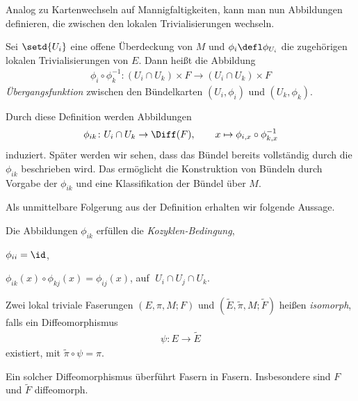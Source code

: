 \documentclass[%
	paper=a5,%
	fleqn,%
	DIV=18,%
	BCOR=0mm,
	fontsize=11pt,
	titlepage=false,%
	bibliography=totoc,
	DIV=18,%
	twoside=true,
	pdftitle=Riemannsche Geometrie,
	pdfauthor=Uwe Semmelmann,
	numbers=noendperiod]%
	{scrbook}
\begin{document}
Analog zu Kartenwechseln auf Mannigfaltigkeiten, kann man nun
Abbildungen definieren, die zwischen den lokalen Trivialisierungen wechseln.

\begin{defn}
Sei $\setd{U_i}$ eine offene Überdeckung von $M$ und $\phi_i\defl \phi_{U_i}$
die zugehörigen lokalen Trivialisierungen von $E$. Dann heißt die Abbildung
\begin{align*}
\phi_i\circ\phi_k^{-1} \colon (U_i\cap U_k)\times F\to (U_i\cap U_k)\times F
\end{align*}
\emph{Übergangsfunktion} zwischen den Bündelkarten $(U_i,\phi_i)$ und
$(U_k,\phi_k)$.\fish
\end{defn}


Durch diese Definition werden Abbildungen
\begin{align*}
\phi_{ik}\colon U_i\cap U_k\to \Diff(F),\qquad x\mapsto
\phi_{i,x}\circ\phi_{k,x}^{-1}
\end{align*}
induziert. Später werden wir sehen, dass das Bündel bereits vollständig durch
die $\phi_{ik}$ beschrieben wird. Das ermöglicht die Konstruktion von Bündeln
durch Vorgabe der $\phi_{ik}$ und eine Klassifikation der Bündel über $M$.

Als unmittelbare Folgerung aus der Definition erhalten wir folgende Aussage.

\begin{lem}
Die Abbildungen $\phi_{ik}$ erfüllen die \emph{Kozyklen-Bedingung},
\begin{propenum}
\item $\phi_{ii} = \id$,
\item $\phi_{ik}(x)\circ\phi_{kj}(x) = \phi_{ij}(x)$,\qquad
auf $ \;U_i\cap U_j\cap U_k$.\fish
\end{propenum}
\end{lem}


\begin{defn}
Zwei lokal triviale Faserungen $(E,\pi,M;F)$ und
$(\tilde{E},\tilde{\pi},M;\tilde{F})$ heißen \emph{isomorph}, falls ein
Diffeomorphismus
\begin{align*}
\psi\colon E\to \tilde{E}
\end{align*}
existiert, mit $\tilde{\pi}\circ\psi = \pi$.\fish
\end{defn}

Ein solcher Diffeomorphismus überführt Fasern in Fasern. Insbesondere sind $F$
und $\tilde{F}$ diffeomorph.
\end{document}
